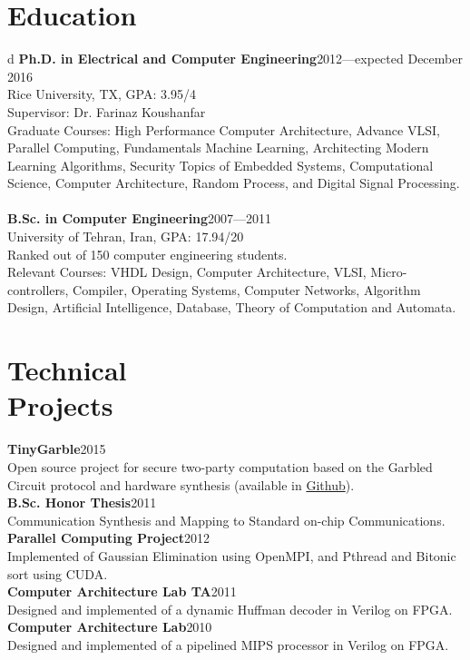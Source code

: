 \documentclass[overlapped]{res}
\begin{document}
\begin{resume}
\section{Education}d
{\bf Ph.D. in Electrical and Computer Engineering}\hfill 2012---expected December 2016\\
Rice University, TX, GPA: 3.95/4\\
Supervisor: Dr. Farinaz Koushanfar\\
Graduate Courses: High Performance Computer Architecture, Advance VLSI, Parallel Computing, Fundamentals Machine Learning, Architecting Modern Learning Algorithms, Security Topics of Embedded Systems, Computational Science, Computer Architecture, Random Process, and Digital Signal Processing.\\\\
{\bf B.Sc. in Computer Engineering}\hfill 2007---2011\\
University of Tehran, Iran, GPA: 17.94/20\\
Ranked  out of 150 computer engineering students.\\		
Relevant Courses: VHDL Design, Computer Architecture, VLSI, Micro-controllers, Compiler, Operating Systems, Computer Networks, Algorithm Design, Artificial Intelligence, Database, Theory of Computation and Automata.

\section{Technical\\ Projects}
{\bf TinyGarble}\hfill 2015\\
Open source project for secure two-party computation based on the Garbled Circuit protocol and hardware synthesis (available in \href{https://github.com/esonghori}{Github}).\\
{\bf B.Sc. Honor Thesis}\hfill 2011\\
Communication Synthesis and Mapping to Standard on-chip Communications.\\
{\bf Parallel Computing Project}\hfill 2012\\
Implemented of Gaussian Elimination using OpenMPI, and Pthread and Bitonic sort using CUDA.\\
{\bf Computer Architecture Lab TA}\hfill 2011\\
Designed and implemented of a dynamic Huffman decoder in Verilog on FPGA.\\
{\bf Computer Architecture Lab}\hfill 2010\\
Designed and implemented of a pipelined MIPS processor in Verilog on FPGA.\\


\end{resume}
\end{document}
